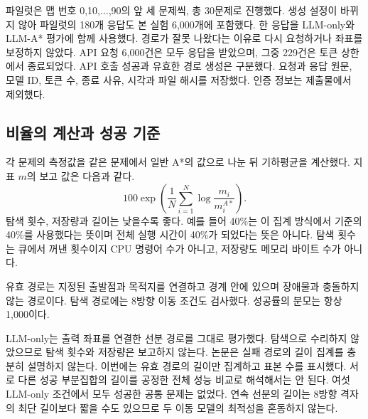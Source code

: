 \documentclass[11pt]{article}
\begin{document}
파일럿은 맵 번호 0,10,$\ldots$,90의 앞 세 문제씩, 총 30문제로 진행했다. 생성 설정이 바뀌지 않아 파일럿의 180개 응답도 본 실험 6,000개에 포함했다. 한 응답을 LLM-only와 LLM-A* 평가에 함께 사용했다. 경로가 잘못 나왔다는 이유로 다시 요청하거나 좌표를 보정하지 않았다. API 요청 6,000건은 모두 응답을 받았으며, 그중 229건은 토큰 상한에서 종료되었다. API 호출 성공과 유효한 경로 생성은 구분했다. 요청과 응답 원문, 모델 ID, 토큰 수, 종료 사유, 시각과 파일 해시를 저장했다. 인증 정보는 제출물에서 제외했다.

\subsection{비율의 계산과 성공 기준}
각 문제의 측정값을 같은 문제에서 일반 A*의 값으로 나눈 뒤 기하평균을 계산했다. 지표 $m$의 보고 값은 다음과 같다.
\begin{equation}
100\exp\left(\frac{1}{N}\sum_{i=1}^{N}\log\frac{m_i}{m_i^{A*}}\right).
\end{equation}
탐색 횟수, 저장량과 길이는 낮을수록 좋다. 예를 들어 40\%는 이 집계 방식에서 기준의 40\%를 사용했다는 뜻이며 전체 실행 시간이 40\%가 되었다는 뜻은 아니다. 탐색 횟수는 큐에서 꺼낸 횟수이지 CPU 명령어 수가 아니고, 저장량도 메모리 바이트 수가 아니다.

유효 경로는 지정된 출발점과 목적지를 연결하고 경계 안에 있으며 장애물과 충돌하지 않는 경로이다. 탐색 경로에는 8방향 이동 조건도 검사했다. 성공률의 분모는 항상 1,000이다.

LLM-only는 출력 좌표를 연결한 선분 경로를 그대로 평가했다. 탐색으로 수리하지 않았으므로 탐색 횟수와 저장량은 보고하지 않는다. 논문은 실패 경로의 길이 집계를 충분히 설명하지 않는다. 이번에는 유효 경로의 길이만 집계하고 표본 수를 표시했다. 서로 다른 성공 부분집합의 길이를 공정한 전체 성능 비교로 해석해서는 안 된다. 여섯 LLM-only 조건에서 모두 성공한 공통 문제는 없었다. 연속 선분의 길이는 8방향 격자의 최단 길이보다 짧을 수도 있으므로 두 이동 모델의 최적성을 혼동하지 않는다.
\end{document}

